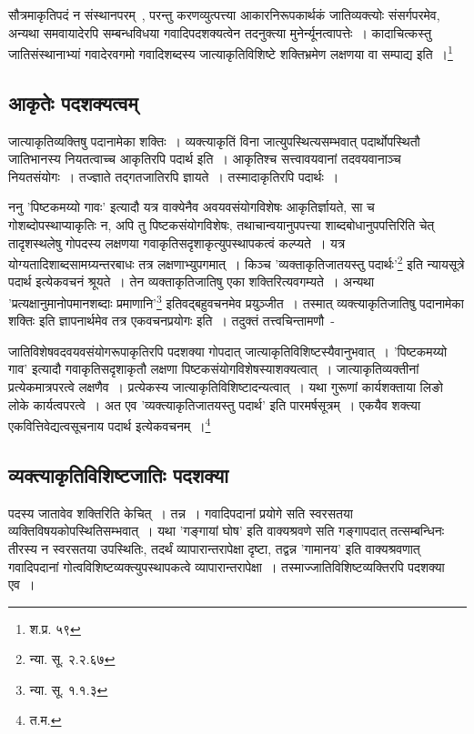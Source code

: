 		{\fontsize{11.7}{0}\selectfont\s  सौत्रमाकृतिपदं न संस्थानपरम्~, परन्तु करणव्युत्पत्त्या आकारनिरूपकार्थकं जातिव्यक्त्योः संसर्गपरमेव, अन्यथा समवायादेरपि सम्बन्धविधया गवादिपदशक्यत्वेन तदनुक्त्या मुनेर्न्यूनत्वापत्तेः~। कादाचित्कस्तु जातिसंस्थानाभ्यां गवादेरवगमो गवादिशब्दस्य जात्याकृतिविशिष्टे शक्तिभ्रमेण लक्षणया वा सम्पाद्य इति~।\footnote{श.प्र. ५९}}

		\subsection{आकृतेः पदशक्यत्वम्} 

		जात्याकृतिव्यक्तिषु पदानामेका शक्तिः‌~। व्यक्त्याकृतिं विना‌ जात्युपस्थित्यसम्भवात् पदार्थोपस्थितौ जातिभानस्य नियतत्वाच्च आकृतिरपि पदार्थ‌ इति~। आकृतिश्च सत्त्वावयवानां तदवयवानाञ्च नियतसंयोगः~। तज्ज्ञाते तद्गतजातिरपि ज्ञायते~। तस्मादाकृतिरपि पदार्थः~। 
		
		ननु 'पिष्टकमय्यो गावः' इत्यादौ यत्र वाक्येनैव अवयवसंयोगविशेषः आकृतिर्ज्ञायते, सा च गोशब्दोपस्थाप्याकृतिः न, अपि तु पिष्टकसंयोगविशेषः, तथाचान्वयानुपपत्त्या शाब्दबोधानुपपत्तिरिति चेत् तादृशस्थलेषु गोपदस्य लक्षणया गवाकृतिसदृशाकृत्युपस्थापकत्वं कल्प्यते~। यत्र योग्यतादिशाब्दसामग्र्यन्तरबाधः तत्र लक्षणाभ्युपगमात्~। किञ्च 'व्यक्ताकृतिजातयस्तु पदार्थः'\footnote{न्या. सू. २.२.६७} इति न्यायसूत्रे पदार्थ इत्येकवचनं श्रूयते~। तेन व्यक्ताकृतिजातिषु एका शक्तिरित्यवगम्यते~। अन्यथा 'प्रत्यक्षानुमानोपमानशब्दाः प्रमाणानि'\footnote{न्या. सू. १.१.३} इतिवद्बहुवचनमेव प्रयुञ्जीत~। तस्मात् व्यक्त्याकृतिजातिषु पदानामेका शक्तिः इति ज्ञापनार्थमेव तत्र एकवचनप्रयोगः इति~। तदुक्तं तत्त्वचिन्तामणौ~-

		{\fontsize{11.7}{0}\selectfont\s जातिविशेषवदवयवसंयोगरूपाकृतिरपि पदशक्या गोपदात् जात्याकृतिविशिष्टस्यैवानुभवात्~। 'पिष्टकमय्यो गाव' इत्यादौ गवाकृतिसदृशाकृतौ लक्षणा पिष्टकसंयोगविशेषस्याशक्यत्वात्~। जात्याकृतिव्यक्तीनां प्रत्येकमात्रपरत्वे लक्षणैव~। प्रत्येकस्य जात्याकृतिविशिष्टादन्यत्वात्~। यथा गुरूणां कार्यशक्ताया लिङो लोके कार्यत्वपरत्वे~। अत एव ’व्यक्त्याकृतिजातयस्तु पदार्थ’ इति पारमर्षसूत्रम्~। एकयैव शक्त्या एकवित्तिवेद्यत्वसूचनाय पदार्थ इत्येकवचनम्~।\footnote{त.म. }}

		\subsection{व्यक्त्याकृतिविशिष्टजातिः पदशक्या}

		पदस्य जातावेव शक्तिरिति केचित्~। तन्न~। गवादिपदानां प्रयोगे सति स्वरसतया व्यक्तिविषयकोपस्थितिसम्भवात्~। यथा 'गङ्गायां घोष' इति वाक्यश्रवणे सति गङ्गापदात् तत्सम्बन्धिनः तीरस्य न स्वरसतया उपस्थितिः, तदर्थं व्यापारान्तरापेक्षा दृष्टा, तद्वन्न 'गामानय' इति वाक्यश्रवणात् गवादिपदानां गोत्वविशिष्टव्यक्त्युपस्थापकत्वे व्यापारान्तरापेक्षा~। तस्माज्जातिविशिष्टव्यक्तिरपि पदशक्या एव~।

